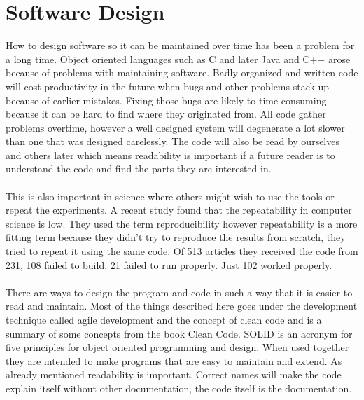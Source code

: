 \documentclass[10pt,a4paper]{report}
\begin{document}
\clearpage
\section{Software Design}
How to design software so it can be maintained over time has been a problem for a long time. Object oriented languages such as C and later Java and C++ arose because of problems with maintaining software. Badly organized and written code will cost productivity in the future when bugs and other problems stack up because of earlier mistakes. Fixing those bugs are likely to time consuming because it can be hard to find where they originated from. All code gather problems overtime, however a well designed system will degenerate a lot slower than one that was designed carelessly. The code will also be read by ourselves and others later which means readability is important if a future reader is to understand the code and find the parts they are interested in. \cite{cleancode2008, design_patterns}\\
\\
This is also important in science where others might wish to use the tools or repeat the experiments. A recent study\cite{comp_repro_2013} found that the repeatability in computer science is low. They used the term reproducibility however repeatability is a more fitting term because they didn't try to reproduce the results from scratch, they tried to repeat it using the same code. Of 513 articles they received the code from 231, 108 failed to build, 21 failed to run properly\cite{comp_repro_2013}. Just 102 worked properly\cite{comp_repro_2013}.\\
\\
There are ways to design the program and code in such a way that it is easier to read and maintain. Most of the things described here goes under the development technique called agile development and the concept of clean code and is a summary of some concepts from the book Clean Code\cite{cleancode2008}. SOLID is an acronym for five principles for object oriented programming and design\cite{cleancode2008}. When used together they are intended to make programs that are easy to maintain and extend\cite{cleancode2008}. As already mentioned readability is important. Correct names will make the code explain itself without other documentation, the code itself is the documentation\cite{cleancode2008}.
\end{document}
